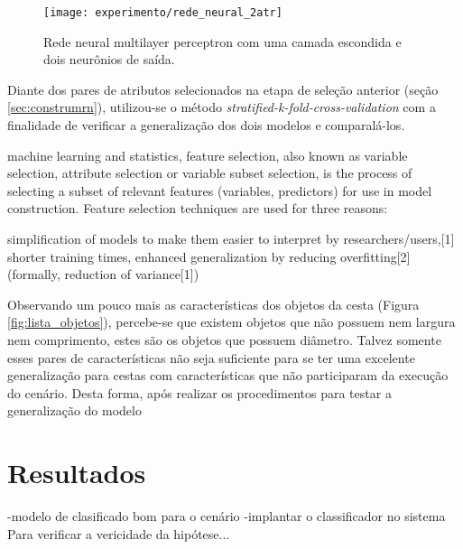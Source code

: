 \begin{figure}[!htb] \centering 
  \centering
  \texttt{[image: experimento/rede\_neural\_2atr]} 
  \caption{Rede neural multilayer perceptron com uma camada escondida e dois neurônios de saída. } 
  \label{fig:rede_neural_2atr}
\end{figure}

Diante dos pares de atributos selecionados na etapa de seleção anterior (seção \ref{sec:construmrn}), utilizou-se o método \textit{stratified-k-fold-cross-validation} com a finalidade de verificar a generalização dos dois modelos e comparalá-los.

 machine learning and statistics, feature selection, also known as variable selection, attribute selection or variable subset selection, is the process of selecting a subset of relevant features (variables, predictors) for use in model construction. Feature selection techniques are used for three reasons:

        simplification of models to make them easier to interpret by researchers/users,[1]
        shorter training times,
        enhanced generalization by reducing overfitting[2](formally, reduction of variance[1])

Observando um pouco mais as características dos objetos da cesta (Figura \ref{fig:lista_objetos}), percebe-se que existem objetos que não possuem nem largura nem comprimento, estes são os objetos que possuem diâmetro. Talvez somente esses pares de características não seja suficiente para se ter uma excelente generalização para cestas com características que não participaram da execução do cenário. Desta forma, após realizar os procedimentos para testar a generalização do modelo 

\section{Resultados}
-modelo de clasificado bom para o cenário
-implantar o classificador no sistema
Para verificar a vericidade da hipótese...
